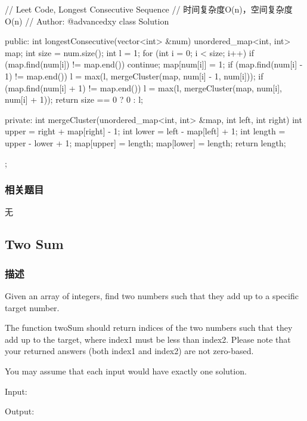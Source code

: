 \begin{Code}
// Leet Code, Longest Consecutive Sequence
// 时间复杂度O(n)，空间复杂度O(n)
// Author: @advancedxy
class Solution {
public:
    int longestConsecutive(vector<int> &num) {
        unordered_map<int, int> map;
        int size = num.size();
        int l = 1;
        for (int i = 0; i < size; i++) {
            if (map.find(num[i]) != map.end()) continue;
            map[num[i]] = 1;
            if (map.find(num[i] - 1) != map.end()) {
                l = max(l, mergeCluster(map, num[i] - 1, num[i]));
            }
            if (map.find(num[i] + 1) != map.end()) {
                l = max(l, mergeCluster(map, num[i], num[i] + 1));
            }
        }
        return size == 0 ? 0 : l;
    }

private:
    int mergeCluster(unordered_map<int, int> &map, int left, int right) {
        int upper = right + map[right] - 1;
        int lower = left - map[left] + 1;
        int length = upper - lower + 1;
        map[upper] = length;
        map[lower] = length;
        return length;
    }
};
\end{Code}

\subsubsection{相关题目}
\begindot
\item 无
\myenddot


\subsection{Two Sum} %
\label{sec:Two-sum}


\subsubsection{描述}
Given an array of integers, find two numbers such that they add up to a specific target number.

The function twoSum should return indices of the two numbers such that they add up to the target, where index1 must be less than index2. Please note that your returned answers (both index1 and index2) are not zero-based.

You may assume that each input would have exactly one solution.

Input:  

Output: 


